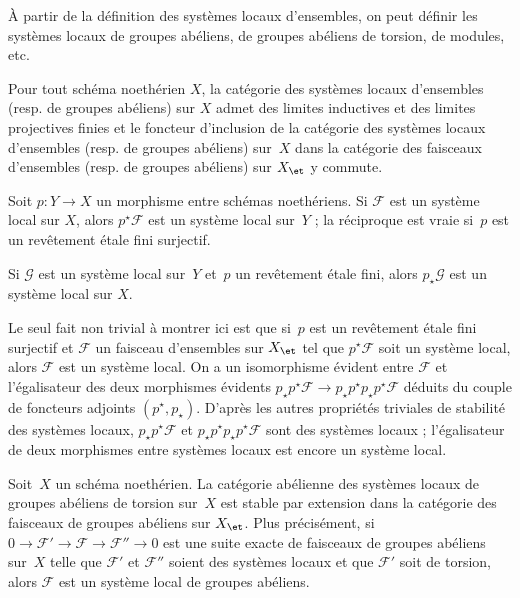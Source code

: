 \documentclass[10pt]{../fichiers-configuration-latex/smfart}
\begin{document}
\bigskip

À partir de la définition des systèmes locaux d'ensembles, on peut définir
les systèmes locaux de groupes abéliens, de groupes abéliens de torsion, de
modules, etc.

\begin{proposition2}\label{17-proposition-stabilites-systemes-locaux}
Pour tout schéma noethérien $X$, la catégorie des systèmes locaux
d'ensembles (resp. de groupes abéliens) sur $X$
admet des limites inductives et des limites projectives finies et le
foncteur d'inclusion de la catégorie des systèmes locaux d'ensembles (resp.
de groupes abéliens) sur $X$ dans la
catégorie des faisceaux d'ensembles (resp. de groupes abéliens)
sur $X_\et$ y commute.

Soit $p\colon Y\to X$ un morphisme entre schémas noethériens.
Si $\mathscr F$ est un système local sur $X$, alors $p^\star \mathscr F$
est un système local sur $Y$ ; la réciproque est vraie si $p$ est un
revêtement étale fini surjectif.

Si $\mathscr G$ est un système local sur $Y$ et $p$ un revêtement étale
fini, alors $p_\star \mathscr G$ est un système local sur $X$.
\end{proposition2}

Le seul fait non trivial à montrer ici est que si $p$ est un revêtement
étale fini surjectif et $\mathscr F$ un faisceau d'ensembles sur $X_\et$
tel que $p^\star \mathscr F$ soit un système local, alors $\mathscr F$ est
un système local. On a un isomorphisme évident entre $\mathscr F$ et
l'égalisateur des deux morphismes évidents $p_\star p^\star \mathscr F\to
p_\star p^\star p_\star p^\star \mathscr F$ déduits du couple de foncteurs
adjoints $(p^\star,p_\star)$. D'après les autres propriétés triviales de
stabilité des systèmes locaux, $p_\star p^\star \mathscr F$ et $p_\star
p^\star p_\star p^\star \mathscr F$ sont des systèmes locaux ;
l'égalisateur de deux morphismes entre systèmes locaux est encore un
système local.

\begin{proposition2}\label{17-proposition-devissage-systemes-locaux}
Soit $X$ un schéma noethérien. La catégorie abélienne des systèmes locaux
de groupes abéliens de torsion sur $X$ est stable par extension dans la
catégorie des faisceaux de groupes abéliens sur $X_\et$. Plus précisément,
si $0\to \mathscr F'\to\mathscr F\to\mathscr F''\to 0$ est une suite exacte
de faisceaux de groupes abéliens sur $X$ telle que $\mathscr F'$ et
$\mathscr F''$ soient des systèmes locaux et que $\mathscr F'$
soit de torsion, alors $\mathscr F$ est un système local de groupes
abéliens.
\end{proposition2}
\end{document}
